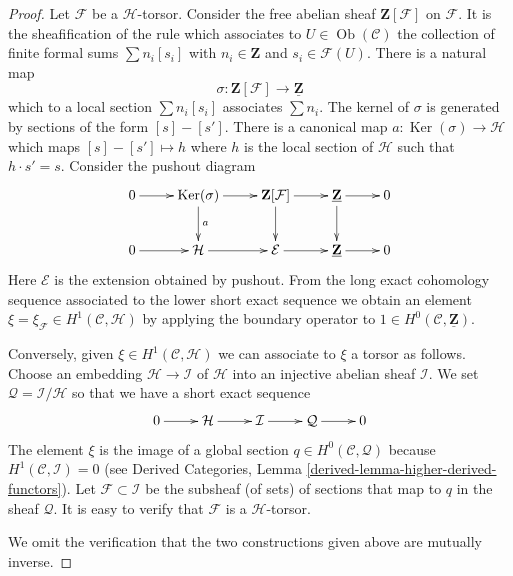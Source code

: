\documentclass[10pt,a4paper]{amsart}
\theoremstyle{plain}
\theoremstyle{definition}
\theoremstyle{remark}
\numberwithin{equation}{subsection}
\def\Ob{\mathop{\mathrm{Ob}}\nolimits}
\def\Ker{\mathop{\mathrm{Ker}}}
\begin{document}
\begin{proof}
Let $\mathcal{F}$ be a $\mathcal{H}$-torsor.
Consider the free abelian sheaf $\mathbf{Z}[\mathcal{F}]$
on $\mathcal{F}$. It is the sheafification of the rule
which associates to $U \in \Ob(\mathcal{C})$ the collection of finite
formal sums $\sum n_i[s_i]$ with $n_i \in \mathbf{Z}$
and $s_i \in \mathcal{F}(U)$. There is a natural map
$$
\sigma : \mathbf{Z}[\mathcal{F}] \longrightarrow \underline{\mathbf{Z}}
$$
which to a local section $\sum n_i[s_i]$ associates $\sum n_i$.
The kernel of $\sigma$ is generated by sections of the form
$[s] - [s']$. There is a canonical map
$a : \Ker(\sigma) \to \mathcal{H}$
which maps $[s] - [s'] \mapsto h$ where $h$ is the local section of
$\mathcal{H}$ such that $h \cdot s' = s$. Consider the pushout diagram
$$
\xymatrix{
0 \ar[r] &
\Ker(\sigma) \ar[r] \ar[d]^a &
\mathbf{Z}[\mathcal{F}] \ar[r] \ar[d] &
\underline{\mathbf{Z}} \ar[r] \ar[d] &
0 \\
0 \ar[r] &
\mathcal{H} \ar[r] &
\mathcal{E} \ar[r] &
\underline{\mathbf{Z}} \ar[r] &
0
}
$$
Here $\mathcal{E}$ is the extension obtained by pushout.
From the long exact cohomology sequence associated to the lower
short exact sequence we obtain an element
$\xi = \xi_\mathcal{F} \in H^1(\mathcal{C}, \mathcal{H})$
by applying the boundary operator to
$1 \in H^0(\mathcal{C}, \underline{\mathbf{Z}})$.

\medskip\noindent
Conversely, given $\xi \in H^1(\mathcal{C}, \mathcal{H})$ we can associate to
$\xi$ a torsor as follows. Choose an embedding $\mathcal{H} \to \mathcal{I}$
of $\mathcal{H}$ into an injective abelian sheaf $\mathcal{I}$. We set
$\mathcal{Q} = \mathcal{I}/\mathcal{H}$ so that we have a short exact
sequence
$$
\xymatrix{
0 \ar[r] &
\mathcal{H} \ar[r] &
\mathcal{I} \ar[r] &
\mathcal{Q} \ar[r] &
0
}
$$
The element $\xi$ is the image of a global section
$q \in H^0(\mathcal{C}, \mathcal{Q})$
because $H^1(\mathcal{C}, \mathcal{I}) = 0$ (see
Derived Categories, Lemma \ref{derived-lemma-higher-derived-functors}).
Let $\mathcal{F} \subset \mathcal{I}$ be the subsheaf (of sets) of sections
that map to $q$ in the sheaf $\mathcal{Q}$. It is easy to verify that
$\mathcal{F}$ is a $\mathcal{H}$-torsor.

\medskip\noindent
We omit the verification that the two constructions given
above are mutually inverse.
\end{proof}
\end{document}
